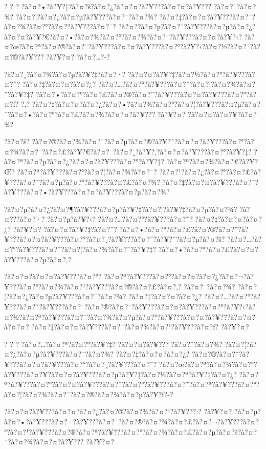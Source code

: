 \documentclass[11pt, openany]{book}
\begin{document}
{{{{{{{{{{{{{{? ? ? ?à?¤?•?à?¥?‡?à?¤?š?à?¤?¿?à?¤?¤?à?¥???à?¤?¤?à?¥??? ?à?¤?¯?à?¤?¾?
?à?¤?¦?à?¤?¿?à?¤?µ?à?¥???à?¤?¯?à?¤?¾?
?à?¤?‡?à?¤?¤?à?¥???à?¤?¯?à?¤?¾?à?¤?°?à?¤?­?à?¥???à?¤?¯?
?à?¤?­?à?¤?µ?à?¤?¨?à?¥???à?¤?µ?à?¤?¿?à?¤?¤?à?¥?€?à?¤?•?à?¤?¾?à?¤?°?à?¤?¾?à?¤?¨?à?¥???à?¤?¤?à?¥?‹?
?à?¤?œ?à?¤?ª?à?¤?®?à?¤?¨?à?¥???à?¤?¤?à?¥???à?¤?°?à?¥?‹?à?¤?½?à?¤?¯?à?¤?®?à?¥???
?à?¥?¤? ?à?¤?\ldots{}?-?

?à?¤?¸?à?¤?¾?à?¤?µ?à?¥?‡?à?¤?·? ?à?¤?¤?à?¥?‡?à?¤?½?à?¤?°?à?¥???à?¤?˜?
?à?¤?‡?à?¤?¤?à?¤?¿?
?à?¤?\ldots{}?à?¤?°?à?¥???à?¤?˜?à?¤?¦?à?¤?¾?à?¤?¨?à?¥?‡?
?à?¤?•?à?¤?°?à?¤?£?à?¤?®?à?¤?¨?à?¥???à?¤?¤?à?¥???à?¤?°?à?¤?ƒ? ?,?
?à?¤?‡?à?¤?¤?à?¤?¿?à?¤?•?à?¤?¾?à?¤?°?à?¤?¦?à?¥???à?¤?µ?à?¤?¯?à?¤?•?à?¤?°?à?¤?£?à?¤?¾?à?¤?¤?à?¥???
?à?¥?¤? ?à?¤?¤?à?¤?¥?à?¤?¾?

?à?¤?š?
?à?¤?®?à?¤?¾?à?¤?¨?à?¤?µ?à?¤?®?à?¥?ˆ?à?¤?¤?à?¥???à?¤?°?à?¤?¾?à?¤?¯?à?¤?£?à?¥?€?à?¤?¯?à?¤?¸?à?¥?‚?à?¤?¤?à?¥???à?¤?°?à?¥?‡?
?à?¤?ª?à?¤?µ?à?¤?¿?à?¤?¤?à?¥???à?¤?°?à?¥?‡? ?à?¤?ª?à?¤?¾?à?¤?£?à?¥?Œ?
?à?¤?ª?à?¥???à?¤?°?à?¤?¦?à?¤?¾?à?¤?¯?
?à?¤?¹?à?¤?¿?à?¤?°?à?¤?£?à?¥???à?¤?¯?à?¤?µ?à?¤?°?à?¥???à?¤?£?à?¤?¾?
?à?¤?‡?à?¤?¤?à?¥???à?¤?¯?à?¥???à?¤?•?à?¥???à?¤?¤?à?¥???à?¤?µ?à?¤?¾?

?à?¤?µ?à?¤?¿?à?¤?¶?à?¥???à?¤?µ?à?¥?‡?à?¤?¦?à?¥?‡?à?¤?µ?à?¤?¾?
?à?¤???à?¤?·? ?à?¤?µ?à?¥?‹? ?à?¤?\ldots{}?à?¤?°?à?¥???à?¤?˜?
?à?¤?‡?à?¤?¤?à?¤?¿? ?à?¥?¤? ?à?¤?¤?à?¥?‡?à?¤?¨?
?à?¤?•?à?¤?°?à?¤?£?à?¤?®?à?¤?¨?à?¥???à?¤?¤?à?¥???à?¤?°?à?¤?¸?à?¥???à?¤?¯?à?¥?ˆ?à?¤?µ?à?¤?š?
?à?¤?\ldots{}?à?¤?°?à?¥???à?¤?˜?à?¤?¦?à?¤?¾?à?¤?¨?à?¥?‡?
?à?¤?•?à?¤?°?à?¤?£?à?¤?¤?à?¥???à?¤?µ?à?¤?‚?

?à?¤?¤?à?¤?¤?à?¥???à?¤?°?
?à?¤?ª?à?¥???à?¤?°?à?¤?¤?à?¤?¿?à?¤?¬?à?¥???à?¤?°?à?¤?¾?à?¤?¹?à?¥???à?¤?®?à?¤?£?à?¤?‚?
?à?¤?¯?à?¤?¾? ?à?¤?¦?à?¤?¿?à?¤?µ?à?¥???à?¤?¯?à?¤?¾? ?à?¤?‡?à?¤?¤?à?¤?¿?
?à?¤?\ldots{}?à?¤?°?à?¥???à?¤?˜?à?¥???à?¤?¯?à?¤?®?à?¤?¨?à?¥???à?¤?¤?à?¥???à?¤?°?à?¥?‹?à?¤?½?à?¤?ª?à?¥???à?¤?¯?à?¤?¾?à?¤?µ?à?¤?°?à?¥???à?¤?¤?à?¥???à?¤?¤?à?¤?¤?
?à?¤?‡?à?¤?¤?à?¥???à?¤?¯?à?¤?¾?à?¤?¹?à?¥???à?¤?ƒ? ?à?¥?¤?

? ? ? ?à?¤?\ldots{}?à?¤?ª?à?¤?°?à?¥?‡? ?à?¤?¤?à?¥??? ?à?¤?¯?à?¤?¾?
?à?¤?¦?à?¤?¿?à?¤?µ?à?¥???à?¤?¯?à?¤?¾? ?à?¤?‡?à?¤?¤?à?¤?¿?
?à?¤?®?à?¤?¨?à?¥???à?¤?¤?à?¥???à?¤?°?à?¤?¸?à?¥???à?¤?¯?
?à?¤?œ?à?¤?ª?à?¤?¾?à?¤?°?à?¥???à?¤?¥?à?¤?¤?à?¥???à?¤?µ?à?¥?‡?à?¤?½?à?¤?ª?à?¥?‡?à?¤?¿?
?à?¤?ª?à?¥???à?¤?°?à?¤?¤?à?¥???à?¤?¯?à?¤?°?à?¥???à?¤?˜?à?¤?ª?à?¥???à?¤?°?à?¤?¦?à?¤?¾?à?¤?¨?à?¤?®?à?¤?¾?à?¤?µ?à?¥?ƒ?-?

?à?¤?¤?à?¥???à?¤?¤?à?¤?¿?à?¤?®?à?¤?¾?à?¤?¹?à?¥???:? ?à?¥?¤?
?à?¤?µ?à?¤?•?à?¥???à?¤?·?à?¥???à?¤?¯?à?¤?®?à?¤?¾?à?¤?£?à?¤?¬?à?¥???à?¤?°?à?¤?¹?à?¥???à?¤?®?à?¤?ª?à?¥???à?¤?°?à?¤?¾?à?¤?£?à?¤?µ?à?¤?š?à?¤?¨?à?¤?¾?à?¤?¤?à?¥???
?à?¥?¤?

}}}}}}}}}}}}}}
\end{document}
